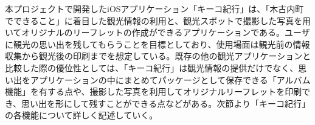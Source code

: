 本プロジェクトで開発したiOSアプリケーション「キーコ紀行」は、「木古内町でできること」に着目した観光情報の利用と、観光スポットで撮影した写真を用いてオリジナルのリーフレットの作成ができるアプリケーションである。ユーザに観光の思い出を残してもらうことを目標としており、使用場面は観光前の情報収集から観光後の印刷までを想定している。既存の他の観光アプリケーションと比較した際の優位性としては、「キーコ紀行」は観光情報の提供だけでなく、思い出をアプリケーションの中にまとめてパッケージとして保存できる「アルバム機能」を有する点や、撮影した写真を利用してオリジナルリーフレットを印刷でき、思い出を形にして残すことができる点などがある。次節より「キーコ紀行」の各機能について詳しく記述していく。

